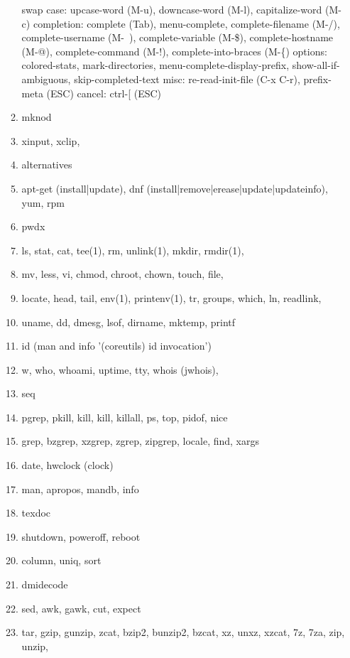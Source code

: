 \documentclass{article}
\begin{document}
\begin{enumerate}
\begin{enumerate}
                swap case: upcase-word (M-u), downcase-word (M-l), capitalize-word (M-c)
                completion: complete (Tab), menu-complete, complete-filename (M-/), complete-username (M-~), complete-variable (M-\$), complete-hostname (M-@), complete-command (M-!), complete-into-braces (M-\{)
                options: colored-stats, mark-directories, menu-complete-display-prefix,
                         show-all-if-ambiguous, skip-completed-text
                misc: re-read-init-file (C-x C-r), prefix-meta (ESC)
                cancel: ctrl-[ (ESC)
            \item mknod
            \item xinput, xclip,
            \item alternatives
            \item apt-get (install|update), dnf (install|remove|erease|update|updateinfo), yum, rpm
            \item pwdx
            \item ls, stat, cat, tee(1), rm, unlink(1), mkdir, rmdir(1),
            \item mv, less, vi, chmod, chroot, chown, touch, file,
            \item locate, head, tail, env(1), printenv(1), tr, groups, which, ln, readlink,
            \item uname, dd, dmesg, lsof, dirname, mktemp, printf
            \item id (man and info '(coreutils) id invocation')
            \item w, who, whoami, uptime, tty, whois (jwhois),
            \item seq
            \item pgrep, pkill, kill, kill, killall, ps, top, pidof, nice
            \item grep, bzgrep, xzgrep, zgrep, zipgrep, locale, find, xargs
            \item date, hwclock (clock)
            \item man, apropos, mandb, info
            \item texdoc
            \item shutdown, poweroff, reboot
            \item column, uniq, sort
            \item dmidecode
            \item sed, awk, gawk, cut, expect
            \item tar, gzip, gunzip, zcat, bzip2, bunzip2, bzcat, xz, unxz, xzcat, 7z, 7za, zip, unzip,

\end{enumerate}
\end{enumerate}
\end{document}
